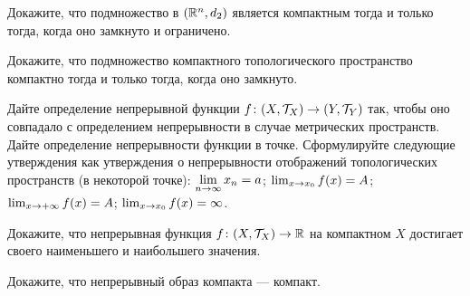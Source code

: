 \documentclass[a4paper,12pt]{article}
\begin{document}
    Докажите, что подмножество в $(\mathbb{R}^n,d_2)$ является компактным тогда и только тогда, когда оно замкнуто и ограничено.


    Докажите, что подмножество компактного топологического пространство компактно тогда и только тогда, когда оно замкнуто.


    Дайте определение  непрерывной функции $f\colon (X,\mathcal{T}_X)\rightarrow (Y,\mathcal{T}_Y)$ так, чтобы оно совпадало с определением непрерывности в случае метрических пространств.\\
    Дайте определение непрерывности функции в точке.
    Сформулируйте следующие утверждения как утверждения о непрерывности отображений топологических пространств (в некоторой точке):
    $\lim\limits_{n \rightarrow \infty} x_n = a$; $\lim_{x\rightarrow x_0} f(x) = A$; $\lim_{x\rightarrow +\infty} f(x) = A$;  $\lim_{x\rightarrow x_0} f(x) = \infty$.


    Докажите, что непрерывная функция $f\colon(X,\mathcal{T}_X)\rightarrow\mathbb{R}$ на компактном $X$ достигает своего наименьшего и наибольшего значения.

    Докажите, что непрерывный образ компакта --- компакт.

\vfill
{}
\end{document}
